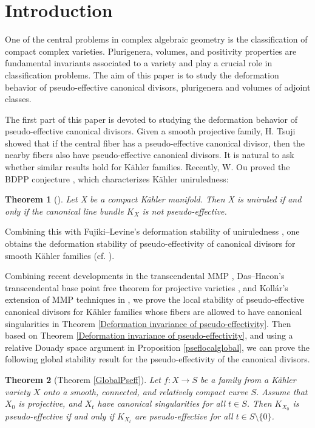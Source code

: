 \documentclass[12pt]{amsart}
\numberwithin{equation}{section}
\newtheorem{theorem} {Theorem} [section]
\theoremstyle{definition}
\theoremstyle{plain}
\newtheorem*{thm A*}{Theorem A}
\newtheorem*{thm B*}{Theorem B}
\newtheorem*{thm C*}{Theorem C}
\newtheorem*{thm D*}{Theorem D}
\theoremstyle{definition}
\renewcommand{\1}{\mathds{1}}
\renewcommand{\>}{\rightarrow}
\begin{document}
\section{Introduction}\label{Introduction}

One of the central problems in complex algebraic geometry is the classification of compact complex varieties. Plurigenera, volumes, and positivity properties are fundamental invariants associated to a variety and play a crucial role in classification problems. The aim of this paper is to study the deformation behavior of pseudo-effective canonical divisors, plurigenera and volumes of adjoint classes. 

The first part of this paper is devoted to studying the deformation behavior of pseudo-effective canonical divisors. Given a smooth projective family, H. Tsuji \cite{Tsuji02} showed that if the central fiber has a pseudo-effective canonical divisor, then the nearby fibers also have pseudo-effective canonical divisors. It is natural to ask whether similar results hold for K\"ahler families. Recently, W. Ou \cite{Ou25} proved the BDPP conjecture \cite[Conjecture 1.2]{BDPP}, which characterizes K\"ahler uniruledness:
\begin{theorem}[{\cite[Theorem 1.1]{Ou25}}]\label{Theorem Ou25}
Let X be a compact K\"ahler manifold. Then X is uniruled if and only if the canonical line bundle $K_X$ is not pseudo-effective.
\end{theorem}
Combining this with Fujiki--Levine's deformation stability of uniruledness \cite{Fujiki,Levine}, one obtains the deformation stability of pseudo-effectivity of canonical divisors for smooth K\"ahler families (cf. \cite[Corollary 5.5]{CP25}). 

Combining recent developments in the transcendental MMP \cite{DH24MMP}, Das--Hacon's transcendental base point free theorem for projective varieties \cite{DH24MMP}, and Koll\'ar's extension of MMP techniques in \cite{DefGeneralType}, we prove the local stability of pseudo-effective canonical divisors for K\"ahler families whose fibers are allowed to have canonical singularities in Theorem \ref{Deformation invariance of pseudo-effectivity}. Then based on Theorem \ref{Deformation invariance of pseudo-effectivity}, and using a relative Douady space argument in Proposition \ref{pseflocalglobal}, we can prove the following global stability result for the pseudo-effectivity of the canonical divisors. 
\begin{theorem}[Theorem \ref{GlobalPseff}]\label{MainPSEF}
Let $f: X \to S$ be a family from a K\"ahler variety $X$ onto a smooth, connected, and relatively compact curve $S$. Assume that $X_0$ is projective, and $X_t$ have canonical singularities for all $t\in S$. Then $K_{X_0}$ is pseudo-effective if and only if $K_{X_t} $ are pseudo-effective for all $t \in S \setminus \{0\}$.
\end{theorem}
\end{document}
